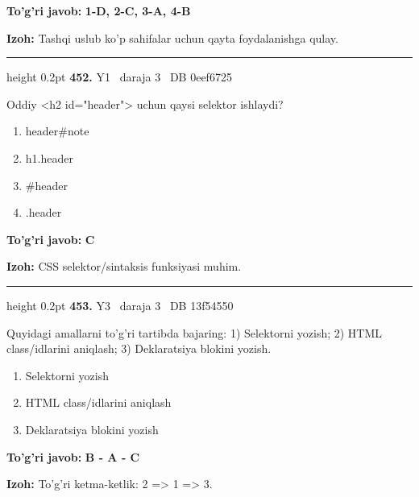 \documentclass[10pt,a4paper,oneside]{article}
\begin{document}
\begin{tcolorbox}[enhanced,breakable,colback=teal!4,colframe=teal!45!black,boxrule=0.45pt,arc=1.2mm,left=2.8mm,right=2.8mm,top=2mm,bottom=2mm,before skip=2mm,after skip=2mm]
\textbf{\color{teal}To'g'ri javob:} \textbf{1-D, 2-C, 3-A, 4-B}
\par\smallskip
\textbf{Izoh:} Tashqi uslub ko'p sahifalar uchun qayta foydalanishga qulay.
\end{tcolorbox}
\vspace{2mm}\hrule height 0.2pt \vspace{4mm}
\hypertarget{q452}{\textbf{\color{ink}452.}}  {\color{muted}\scriptsize Y1 \textbullet\ daraja 3 \textbullet\ DB 0eef6725}
\par
Oddiy \textless{}h2 id="header"\textgreater{} uchun qaysi selektor ishlaydi?
\begin{enumerate}[label=\Alph*),leftmargin=9mm]
\item header\#note
\item h1.header
\item \#header
\item .header
\end{enumerate}
\begin{tcolorbox}[enhanced,breakable,colback=teal!4,colframe=teal!45!black,boxrule=0.45pt,arc=1.2mm,left=2.8mm,right=2.8mm,top=2mm,bottom=2mm,before skip=2mm,after skip=2mm]
\textbf{\color{teal}To'g'ri javob:} \textbf{C}
\par\smallskip
\textbf{Izoh:} CSS selektor/sintaksis funksiyasi muhim.
\end{tcolorbox}
\vspace{2mm}\hrule height 0.2pt \vspace{4mm}
\hypertarget{q453}{\textbf{\color{ink}453.}}  {\color{muted}\scriptsize Y3 \textbullet\ daraja 3 \textbullet\ DB 13f54550}
\par
Quyidagi amallarni to'g'ri tartibda bajaring: 1) Selektorni yozish; 2) HTML class/idlarini aniqlash; 3) Deklaratsiya blokini yozish.
\begin{enumerate}[label=\Alph*),leftmargin=9mm]
\item Selektorni yozish
\item HTML class/idlarini aniqlash
\item Deklaratsiya blokini yozish
\end{enumerate}
\begin{tcolorbox}[enhanced,breakable,colback=teal!4,colframe=teal!45!black,boxrule=0.45pt,arc=1.2mm,left=2.8mm,right=2.8mm,top=2mm,bottom=2mm,before skip=2mm,after skip=2mm]
\textbf{\color{teal}To'g'ri javob:} \textbf{B - A - C}
\par\smallskip
\textbf{Izoh:} To'g'ri ketma-ketlik: 2 =\textgreater{} 1 =\textgreater{} 3.
\end{tcolorbox}
\end{document}
